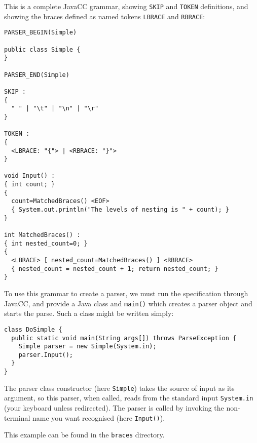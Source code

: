 \documentclass{article}
\begin{document}
This is a complete JavaCC grammar,
showing \verb+SKIP+ and \verb+TOKEN+ definitions,
and showing the braces defined as named tokens
\verb+LBRACE+ and \verb+RBRACE+:
\begin{verbatim}
PARSER_BEGIN(Simple)

public class Simple {
}

PARSER_END(Simple)

SKIP :
{
  " " | "\t" | "\n" | "\r"
}

TOKEN :
{
  <LBRACE: "{"> | <RBRACE: "}">
}

void Input() :
{ int count; }
{
  count=MatchedBraces() <EOF>
  { System.out.println("The levels of nesting is " + count); }
}

int MatchedBraces() :
{ int nested_count=0; }
{
  <LBRACE> [ nested_count=MatchedBraces() ] <RBRACE>
  { nested_count = nested_count + 1; return nested_count; } 
}
\end{verbatim}
To use this grammar to create a parser, we must run the specification through
JavaCC, and provide a Java class and \verb+main()+ which creates
a parser object and starts the parse. Such a class
might be written simply:
\begin{verbatim}
class DoSimple {
  public static void main(String args[]) throws ParseException {
    Simple parser = new Simple(System.in);
    parser.Input();
  }
}
\end{verbatim}
The parser class constructor (here \verb+Simple+) takes the source
of input as its argument, so this parser, when called, reads
from the standard input \verb+System.in+
(your keyboard unless redirected).
The parser is called by invoking the non-terminal name
you want recognised (here \verb+Input()+).

This example can be found in the \verb+braces+ directory. 
\end{document}
